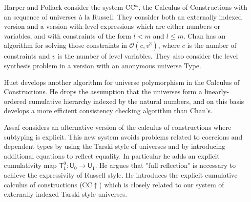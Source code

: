 \documentclass[11pt,a4paper]{article}
\def\UU{\mathsf{U}}
\newcommand{\T}{\mathsf{T}}
\def\Ordo{\mathcal{O}}
\def\CComega{\mathrm{CC}^\omega}
\begin{document}
Harper and Pollack \cite{HarperP91} consider the system $\CComega$, the Calculus of Constructions with an sequence of universes \`a la Russell. They consider both an externally indexed version and a version with level expressions which are either numbers or variables, and with constraints of the form $l < m$ and $l \leq m$. Chan has an algorithm for solving those constraints in $\Ordo(c,v^3)$, where $c$ is the number of constraints and $v$ is the number of level variables. They also consider the level synthesis problem in a version with an anonymous universe Type.

Huet \cite{Huet87} develops another algorithm for universe polymorphism in the Calculus of Constructions. He drops the assumption that the universes form a linearly-ordered cumulative hierarchy indexed by the natural numbers, and on this basis develops a more efficient consistency checking algorithm than Chan's.

Assaf \cite{Assaf14} considers an alternative version of the calculus of
constructions where subtyping is explicit. This new system avoids problems related to coercions and dependent types by using the Tarski style
of universes and by introducing additional equations to reflect equality. In particular he adds an explicit cumulativity map $\T^0_1 : \UU_0 \to \UU_1$. He argues that "full reflection" is necessary to achieve the expressivity of Russell style. He introduces the explicit cumulative calculus of constructions (CC$\uparrow$) which is closely related to our system of externally indexed Tarski style universes.



\end{document}
